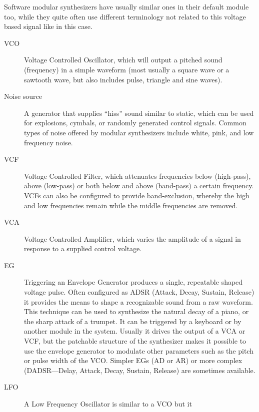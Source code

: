 \begin{mynote}
  \label{note:modsynth} Software modular synthesizers have usually
  similar ones in their default module too, while they quite often use
  different terminology not related to this voltage based signal like
  in this case.
  
 
  \begin{description}
  \item[VCO] Voltage Controlled Oscillator, which will output a
    pitched sound (frequency) in a simple waveform (most usually a
    square wave or a sawtooth wave, but also includes pulse,
    triangle and sine waves).
  \item[Noise source] A generator that supplies ``hiss'' sound similar
    to static, which can be used for explosions, cymbals, or
    randomly generated control signals. Common types of noise
    offered by modular synthesizers include white, pink, and low
    frequency noise.
  \item[VCF] Voltage Controlled Filter, which attenuates frequencies
    below (high-pass), above (low-pass) or both below and above
    (band-pass) a certain frequency. VCFs can also be configured to
    provide band-exclusion, whereby the high and low frequencies
    remain while the middle frequencies are removed.
  \item[VCA] Voltage Controlled Amplifier, which varies the
    amplitude of a signal in response to a supplied control voltage.
  \item[EG] Triggering an Envelope Generator produces a single,
    repeatable shaped voltage pulse. Often configured as ADSR
    (Attack, Decay, Sustain, Release) it provides the means to shape
    a recognizable sound from a raw waveform. This technique can be
    used to synthesize the natural decay of a piano, or the sharp
    attack of a trumpet. It can be triggered by a keyboard or by
    another module in the system. Usually it drives the output of a
    VCA or VCF, but the patchable structure of the synthesizer makes
    it possible to use the envelope generator to modulate other
    parameters such as the pitch or pulse width of the VCO. Simpler
    EGs (AD or AR) or more complex (DADSR—Delay, Attack, Decay,
    Sustain, Release) are sometimes available.
  \item[LFO] A Low Frequency Oscillator is similar to a VCO but it

\end{description}
\end{mynote}
